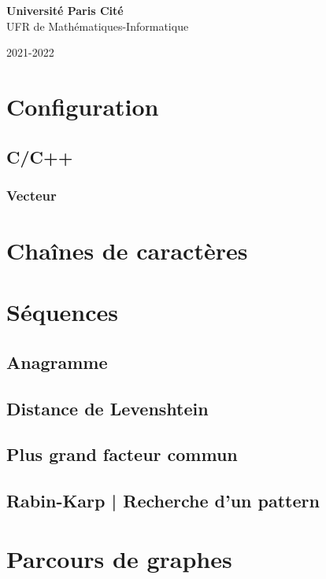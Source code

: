 \documentclass[8pt]{article}
\begin{document}
\begin{titlepage}
\begin{center}
        \textbf{Université Paris Cité}\\
        UFR de Mathématiques-Informatique

        2021-2022

    \end{center}
\end{titlepage}
    \section{Configuration}
        \subsection{C/C++}
            \subsubsection{Vecteur}
            {\scriptsize}
    \section{Chaînes de caractères}
    \section{Séquences}
        \subsection{Anagramme}
        {\scriptsize}
        \subsection{Distance de Levenshtein}
        {\scriptsize}
        \subsection{Plus grand facteur commun}
        {\scriptsize}
        \subsection{Rabin-Karp | Recherche d'un pattern}
        {\scriptsize}
    \section{Parcours de graphes}
\end{document}
